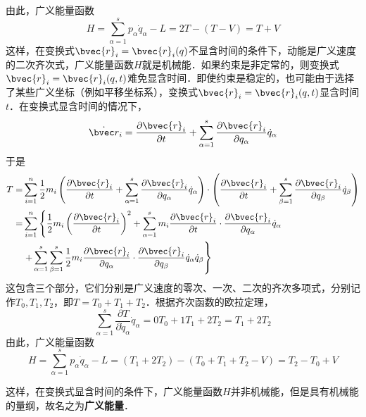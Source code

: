 由此，广义能量函数
\begin{equation}
H=\sum_{\alpha=1}^{s} p_{\alpha} \dot{q}_{\alpha}-L=2 T-(T-V)=T+V
\end{equation}
这样，在变换式$\bvec{r}_{i}=\bvec{r}_{i}(q)$不显含时间的条件下，动能是广义速度的二次齐次式，广义能量函数$H $就是机械能．如果约束是非定常的，则变换式$\bvec{r}_{i}=\bvec{r}_{i}(q, t)$难免显含时间．即使约束是稳定的，也可能由于选择了某些广义坐标（例如平移坐标系），变换式$\bvec{r}_{i}=\bvec{r}_{i}(q, t)$显含时间$t $．在变换式显含时间的情况下，
\begin{equation}
\dot{\bvec r}_{i}=\frac{\partial \bvec{r}_{i}}{\partial t}+\sum_{\alpha=1}^{s} \frac{\partial \bvec{r}_{i}}{\partial q_{\alpha}} \dot{q}_{\alpha}
\end{equation}
于是
\begin{equation}
\begin{aligned} T=& \sum_{i=1}^{n} \frac{1}{2} m_{i}\left(\frac{\partial \bvec{r}_{i}}{\partial t}+\sum_{\alpha=1}^{s} \frac{\partial \bvec{r}_{i}}{\partial q_{\alpha}} \dot{q}_{\alpha}\right) \cdot\left(\frac{\partial \bvec{r}_{i}}{\partial t}+\sum_{\beta=1}^{s} \frac{\partial \bvec{r}_{i}}{\partial q_{\beta}} \dot{q}_{\beta}\right) \\=& \sum_{i=1}^{n}\left\{\frac{1}{2} m_{i}\left(\frac{\partial \bvec{r}_{i}}{\partial t}\right)^{2}+\sum_{\alpha=1}^{s} m_{i} \frac{\partial \bvec{r}_{i}}{\partial t} \cdot \frac{\partial \bvec{r}_{i}}{\partial q_{\alpha}} \dot{q}_{\alpha}\right.\\ &\left.+\sum_{\alpha=1}^{s} \sum_{\beta=1}^{s} \frac{1}{2} m_{i} \frac{\partial \bvec{r}_{i}}{\partial q_{\alpha}} \cdot \frac{\partial \bvec{r}_{i}}{\partial q_{\beta}} \dot{q}_{\alpha} \dot{q}_{\beta}\right\} \end{aligned}
\end{equation}
这包含三个部分，它们分别是广义速度的零次、一次、二次的齐次多项式，分别记作$T_0,T_1,T_2$，即$T=T_0+T_1+T_2$．根据齐次函数的欧拉定理，
\begin{equation}
\sum_{\alpha=1}^{s} \frac{\partial T}{\partial \dot{q}_{\alpha}} \dot{q}_{\alpha}=0 T_{0}+1 T_{1}+2 T_{2}=T_{1}+2 T_{2}
\end{equation}
由此，广义能量函数
\begin{equation}
H=\sum_{\alpha=1}^{s} p_{\alpha} \dot{q}_{\alpha}-L=\left(T_{1}+2 T_{2}\right)-\left(T_{0}+T_{1}+T_{2}-V\right)=T_{2}-T_{0}+V
\end{equation}

这样，在变换式显含时间的条件下，广义能量函数$H $并非机械能，但是具有机械能的量纲，故名之为\textbf{广义能量}．

